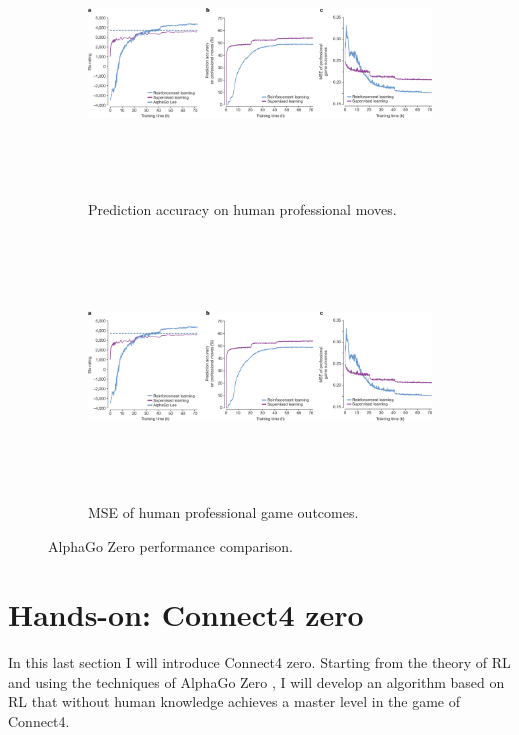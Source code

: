 \documentclass{article}
\begin{document}
\begin{figure}[H]
	\begin{subfigure}{.5\textwidth}
		\centering
		\includegraphics[height=7cm,trim={717px 0px 710px 45px},clip]{alpha-go-zero_empirical_results.png}
		\caption{Prediction accuracy on human professional moves.}
		\label{fig:training-acc}
	\end{subfigure}
	\hfill
	\begin{subfigure}{.5\textwidth}
		\centering
		\includegraphics[height=7cm,trim={1408px 0px 0px 45px},clip]{alpha-go-zero_empirical_results.png}
		\caption{MSE of human professional game outcomes.}
		\label{fig:training-mse}
	\end{subfigure}
	\caption{AlphaGo Zero performance comparison. \cite{Silver_2016}}
\end{figure}


\section{Hands-on: Connect4 zero}
In this last section I will introduce Connect4 zero. Starting from the theory of RL and using the techniques of AlphaGo Zero \cite{silver2017mastering}, I will develop an algorithm based on RL that without human knowledge achieves a master level in the game of Connect4.
\end{document}
